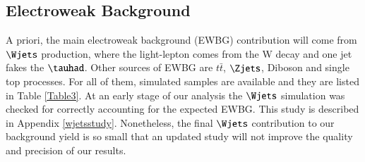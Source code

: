 \subsection{Electroweak Background}
A priori, the main electroweak background (EWBG) contribution will come from $\Wjets$ production, where the light-lepton comes from the W decay and one jet fakes the $\tauhad$. Other sources of EWBG are $t\bar{t}$, $\Zjets$, Diboson and single top processes. For all of them, simulated samples are available and they are listed in Table \ref{Table3}. At an early stage of our analysis the $\Wjets$  simulation was checked for correctly accounting for the expected EWBG. This study is described in Appendix \ref{wjetsstudy}. Nonetheless, the final $\Wjets$ contribution to our background yield is so small that an updated study will not improve the quality and precision of our results.  